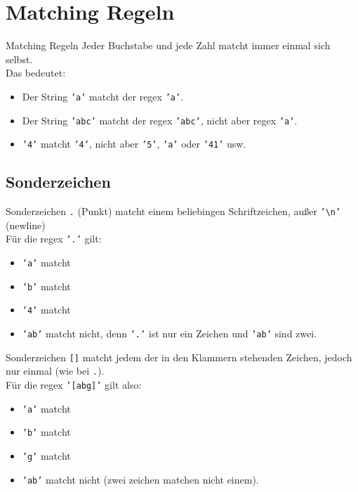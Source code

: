 \section{Matching Regeln}
\begin{frame}{Matching Regeln}
	Jeder Buchstabe und jede Zahl matcht immer \alert{einmal} sich selbst.\\[.25cm]
	Das bedeutet:\\
	\begin{itemize}
		\item 	Der String \texttt{'a'} matcht der regex \texttt{'a'}.\\
		\item Der String \texttt{'abc'} matcht der regex \texttt{'abc'}, nicht aber regex \texttt{'a'}.\\
		\item \texttt{'4'} matcht \texttt{'4'}, nicht aber \texttt{'5'}, \texttt{'a'} oder \texttt{'41'} usw.
	\end{itemize}
\end{frame}

\subsection{Sonderzeichen}
\begin{frame}{Sonderzeichen}
	\texttt{.} (Punkt) matcht \alert{einem} beliebingen Schriftzeichen, außer \texttt{'\textbackslash{}n'} (newline)\\[.25cm]
	Für die regex \texttt{'.'} gilt:\\
	\begin{itemize}
		\item \texttt{'a'} matcht
		\item \texttt{'b'} matcht
		\item \texttt{'4'} matcht
		\item \texttt{'ab'} matcht nicht, denn \texttt{'.'} ist nur ein Zeichen und \texttt{'ab'} sind zwei.
	\end{itemize}
\end{frame}

\begin{frame}{Sonderzeichen}
	\texttt{[]} matcht jedem der in den Klammern stehenden Zeichen, jedoch nur \alert{einmal} (wie bei \texttt{.}).\\[.25cm]
	Für die regex \texttt{'[abg]'} gilt also:\\
	\begin{itemize}
		\item \texttt{'a'} matcht
		\item \texttt{'b'} matcht
		\item \texttt{'g'} matcht
		\item \texttt{'ab'} matcht nicht (zwei zeichen matchen nicht einem).
	\end{itemize}
\end{frame}

